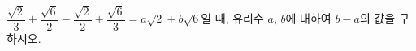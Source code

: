 $\dfrac{\sqrt{2}}{3}+\dfrac{\sqrt{6}}{2}-\dfrac{\sqrt{2}}{2}+\dfrac{\sqrt{6}}{3}=a\sqrt{2}+b\sqrt{6}$일 때, 유리수 $a$, $b$에 대하여 $b-a$의 값을 구하시오.
